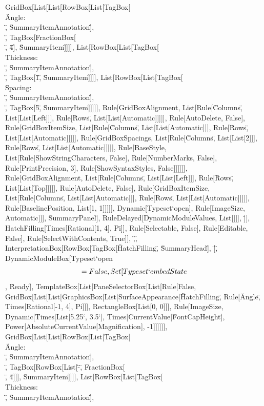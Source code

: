 \documentclass{article}
\begin{document}
{{{{GridBox[List[List[RowBox[List[TagBox[\"\\\"Angle: \\\"\", \"SummaryItemAnnotation\"], \"\\[InvisibleSpace]\", TagBox[FractionBox[\"\\[Pi]\", \"4\"],
\"SummaryItem\"]]]], List[RowBox[List[TagBox[\"\\\"Thickness: \\\"\", \"SummaryItemAnnotation\"], \"\\[InvisibleSpace]\", TagBox[\"1\", \"SummaryItem\"]]]],
List[RowBox[List[TagBox[\"\\\"Spacing: \\\"\", \"SummaryItemAnnotation\"], \"\\[InvisibleSpace]\", TagBox[\"5\", \"SummaryItem\"]]]]], Rule[GridBoxAlignment,
List[Rule[\"Columns\", List[List[Left]]], Rule[\"Rows\", List[List[Automatic]]]]], Rule[AutoDelete, False], Rule[GridBoxItemSize, List[Rule[\"Columns\",
List[List[Automatic]]], Rule[\"Rows\", List[List[Automatic]]]]], Rule[GridBoxSpacings, List[Rule[\"Columns\", List[List[2]]], Rule[\"Rows\", List[List[Automatic]]]]],
Rule[BaseStyle, List[Rule[ShowStringCharacters, False], Rule[NumberMarks, False], Rule[PrintPrecision, 3], Rule[ShowSyntaxStyles, False]]]]]], Rule[GridBoxAlignment,
List[Rule[\"Columns\", List[List[Left]]], Rule[\"Rows\", List[List[Top]]]]], Rule[AutoDelete, False], Rule[GridBoxItemSize, List[Rule[\"Columns\",
List[List[Automatic]]], Rule[\"Rows\", List[List[Automatic]]]]], Rule[BaselinePosition, List[1, 1]]]]], Dynamic[Typeset`open$$], Rule[ImageSize,
Automatic]]], \"SummaryPanel\"], RuleDelayed[DynamicModuleValues, List[]]], \"]\"}], HatchFilling[Times[Rational[1, 4], Pi]], Rule[Selectable, False],
Rule[Editable, False], Rule[SelectWithContents, True]], \",\", InterpretationBox[RowBox[{TagBox[\"HatchFilling\", \"SummaryHead\"], \"[\", DynamicModuleBox[{Typeset`open$$
= False, Set[Typeset`embedState$$, \"Ready\"]}, TemplateBox[List[PaneSelectorBox[List[Rule[False, GridBox[List[List[GraphicsBox[List[SurfaceAppearance[\"HatchFilling\",
Rule[\"Angle\", Times[Rational[-1, 4], Pi]]], RectangleBox[List[0, 0]]], Rule[ImageSize, Dynamic[Times[List[5.25`, 3.5`], Times[CurrentValue[\"FontCapHeight\"],
Power[AbsoluteCurrentValue[Magnification], -1]]]]]], GridBox[List[List[RowBox[List[TagBox[\"\\\"Angle: \\\"\", \"SummaryItemAnnotation\"], \"\\[InvisibleSpace]\",
TagBox[RowBox[List[\"-\", FractionBox[\"\\[Pi]\", \"4\"]]], \"SummaryItem\"]]]], List[RowBox[List[TagBox[\"\\\"Thickness: \\\"\", \"SummaryItemAnnotation\"],
}}}}
\end{document}
